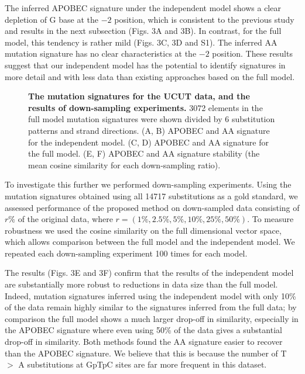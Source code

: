 \documentclass[10pt,letterpaper]{article}
\begin{document}
The inferred APOBEC signature under the independent model
shows a clear depletion of G base at the $-2$ position,
which is consistent to the previous study \cite{pmid23318258} and results in the next subsection (Figs. 3A and 3B).
In contrast, for the full model, this tendency is rather mild (Figs. 3C, 3D and S1).
The inferred AA mutation signature has no clear characteristics at the $-2$ position.
These results suggest that our independent model has the potential
to identify signatures in more detail and with less data than existing approaches based on the full model.

\begin{figure}[h]
\caption{{\bf The mutation signatures for the UCUT data, and the results of down-sampling experiments.}
3072 elements in the full model mutation signatures were shown divided by 6 substitution patterns and strand directions.
(A, B) APOBEC and AA signature for the independent model.
(C, D) APOBEC and AA signature for the full model.
(E, F) APOBEC and AA signature stability (the mean cosine similarity for each down-sampling ratio).}
\label{UCUT}
\end{figure}

To investigate this further we performed down-sampling experiments.
Using the mutation signatures obtained using all 14717 substitutions as a gold standard, 
we assessed performance of the proposed method on down-sampled data consisting of $r\%$ of the original data, where  $r=(1\%, 2.5\%, 5\%, 10\%, 25\%, 50\%)$.
To measure robustness we used the cosine similarity on the 
full dimensional vector space, which allows comparison between the full model and the independent model.
We repeated each down-sampling experiment 100 times for each model.


The results (Figs. 3E and 3F)
confirm that the results of the independent model 
are substantially more robust to reductions in data size than the full model. Indeed, mutation signatures inferred using the independent model with only 10\% of the data 
remain highly similar to the signatures inferred from the full data; by comparison the full model shows a much larger drop-off in similarity, especially in the APOBEC signature where even using 50\% of the data gives a substantial drop-off in similarity. Both methods found the AA signature 
easier to recover than the APOBEC signature.
We believe that this is because the number of T $>$ A substitutions at GpTpC sites are far more frequent in this dataset.
\end{document}
